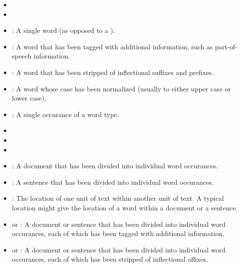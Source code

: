 \documentclass{article}
\begin{document}
  \begin{itemize}
  
    \item {}
  
    \item {}
  
    \item {}: A single word (as opposed to a
        ).
  
    \item {}: A word that has been tagged with
        additional information, such as part-of-speech information.
  
    \item {}: A word that has been stripped of
        inflectional suffixes and prefixes.
  
    \item {}: A word whose case has been
        normalized (usually to either upper case or lower case).
  
    \item {}: A single occurance of a word type.

    \item {}
    \item {}
    \item {}
  
    \item {}: A document that has been divided
        into individual word occurances.
  
    \item {}: A sentence that has been divided
        into individual word occurances.
  
    \item {}: The location of one unit of text within
        another unit of text.  A typical location might give the
        location of a word within a document or a sentence.
  
    \item {} or : A
        document or sentence that has been divided into individual word
        occurances, each of which has been tagged with additional
        information.
  
    \item {} or : A
        document or sentence that has been divided into individual word
        occurances, each of which has been stripped of inflectional
        affixes.
  

\end{itemize}
\end{document}
